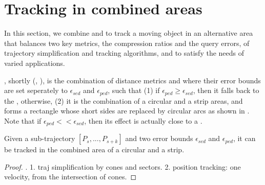 

\section{Tracking in combined areas}
\label{sec:combine}

In this section, we combine \sed and \ped to track a moving object in an alternative area that balances two key metrics, \ie the compression ratios and the query errors, of trajectory simplification and tracking algorithms, and to satisfy the needs of varied applications.


, shortly \bed (\sed, \ped), is the combination of distance metrics \sed and \ped where their error bounds are set seperately to $\epsilon_{sed}$ and $\epsilon_{ped}$, such that (1) if $\epsilon_{ped} \ge \epsilon_{sed}$, then it falls back to the \sed, otherwise, (2) it is the combination of a circular and a strip areas, and forms a rectangle whose short sides are replaced by circular arcs as shown in . Note that if $\epsilon_{ped} << \epsilon_{sed}$, then its effect is actually close to a \ped.




\begin{theorem}
	\label{theo-binary}
	Given a sub-trajectory $[P_s,...,P_{s+k}]$ and two error bounds $\epsilon_{sed}$ and $\epsilon_{ped}$, it can be tracked in the combined area of a circular and a strip.
\end{theorem}

\begin{proof}
	\todo.
	1. traj simplification by cones and sectors.
	2. position tracking: one velocity, from the intersection of cones.
\end{proof}




